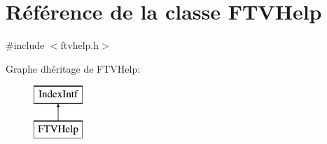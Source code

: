 \hypertarget{class_f_t_v_help}{}\section{Référence de la classe F\+T\+V\+Help}
\label{class_f_t_v_help}


{\ttfamily \#include $<$ftvhelp.\+h$>$}

Graphe d\textquotesingle{}héritage de F\+T\+V\+Help\+:\begin{figure}[H]
\begin{center}
\leavevmode
\includegraphics[height=2.000000cm]{class_f_t_v_help}
\end{center}
\end{figure}
